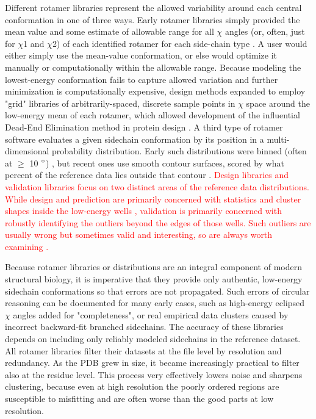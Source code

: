 Different rotamer libraries represent the allowed variability around each central conformation in one of three ways. Early rotamer libraries simply provided the mean value and some estimate of allowable range for all $\chi$ angles (or, often, just for $\chi$1 and $\chi$2) of each identified rotamer for each side-chain type \cite{Ponder1987, Tuffery1991,Schrauber1993}.  A user would either simply use the mean-value conformation, or else would optimize it manually or computationally within the allowable range. Because modeling the lowest-energy conformation fails to capture allowed variation and further minimization is computationally expensive, design methods expanded to employ "grid" libraries of arbitrarily-spaced, discrete sample points in $\chi$ space around the low-energy mean of each rotamer, which allowed development of the influential Dead-End Elimination method in protein design \cite{DeMaeyer1997,Gainza2013}.  A third type of rotamer software \cite{Dunbrack1997, Chen:2010kx} evaluates a given sidechain conformation by its position in a multi-dimensional probability distribution. Early such distributions were binned (often at $\ge$ 10 $\degree$) \cite{Laskowski:gl0276}, but recent ones use smooth contour surfaces, scored by what percent of the reference data lies outside that contour \cite{lovell2000penultimate, Read2011}. \textcolor{red}{Design libraries and validation libraries focus on two distinct areas of the reference data distributions. While design and prediction are primarily concerned with statistics and cluster shapes inside the low-energy wells \cite{Dunbrack1997}, validation is primarily concerned with robustly identifying the outliers beyond the edges of those wells. Such outliers are usually wrong but sometimes valid and interesting, so are always worth examining \cite{Richardson2013}.}

Because rotamer libraries or distributions are an integral component of modern structural biology, it is imperative that they provide only authentic, low-energy sidechain conformations so that errors are not propagated. Such errors of circular reasoning can be documented \cite{lovell2000penultimate} for many early cases, such as high-energy eclipsed $\chi$ angles added for "completeness", or real empirical data clusters caused by incorrect backward-fit branched sidechains. The accuracy of these libraries depends on including only reliably modeled sidechains in the reference dataset. All rotamer libraries filter their datasets at the file level by resolution and redundancy. As the PDB grew in size, it  became increasingly practical to filter also at the residue level. This process very effectively lowers noise and sharpens clustering, because even at high resolution the poorly ordered regions are susceptible to misfitting and are often worse than the good parts at low resolution.

